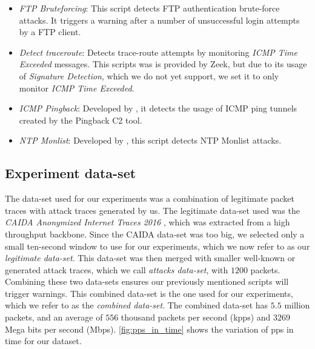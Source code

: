 \begin{itemize}
    \item \textit{FTP Bruteforcing}: This script detects FTP authentication brute-force attacks. It triggers a warning after a number of unsuccessful login attempts by a FTP client.
    \item \textit{Detect traceroute}: Detects trace-route attempts by monitoring \textit{ICMP Time Exceeded} messages. This scripts was is provided by Zeek, but due to its usage of \textit{Signature Detection}, which we do not yet support, we set it to only monitor \textit{ICMP Time Exceeded}.
    \item \textit{ICMP Pingback}: Developed by , it detects the usage of ICMP ping tunnels created by the Pingback C2 tool.
    \item \textit{NTP Monlist}: Developed by , this script detects NTP Monlist attacks.
\end{itemize}





\subsection{Experiment data-set}

The data-set used for our experiments was a combination of legitimate packet traces with attack traces generated by us. The legitimate data-set used was the \textit{CAIDA Anonymized Internet Traces 2016} \cite{CAIDA2016}, which was extracted from a high throughput backbone. Since the CAIDA data-set was too big, we selected only a small ten-second window to use for our experiments, which we now refer to as our \textit{legitimate data-set}. This data-set was then merged with smaller well-known or generated attack traces, which we call \textit{attacks data-set}, with $1200$ packets. Combining these two data-sets ensures our previously mentioned scripts will trigger warnings. This combined data-set is the one used for our experiments, which we refer to as the \textit{combined data-set}. The combined data-set has $5.5$ million packets, and an average of $556$ thousand packets per second (kpps) and $3269$ Mega bits per second (Mbps). \autoref{fig:pps_in_time} shows the variation of pps in time for our dataset.


